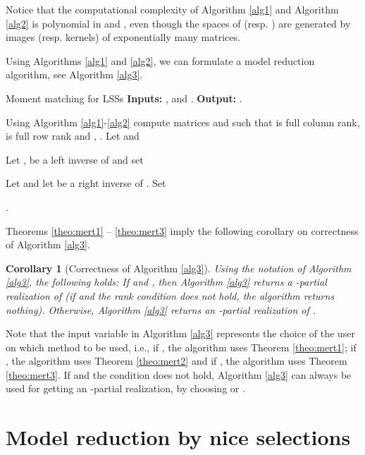 \documentclass[journal]{IEEEtran}
\newtheorem{Corollary}{Corollary}
\begin{document}
Notice that the computational complexity of Algorithm \ref{alg1} and Algorithm \ref{alg2} is polynomial in  and , even though the spaces of  (resp. ) are generated by images (resp. kernels) of exponentially many matrices.

Using Algorithms \ref{alg1} and \ref{alg2}, we can formulate a model reduction algorithm, see Algorithm \ref{alg3}.
\begin{algorithm}
	\caption{Moment matching for LSSs
		\newpage 
		\textbf{Inputs:} ,  and .
		\newpage  
		\textbf{Output: } .
	}
	\label{alg3}
	\begin{algorithmic}
		\STATE Using Algorithm \ref{alg1}-\ref{alg2} compute matrices  and  such that
		 is full column rank,  is full row rank and ,
		.
		\STATE
		Let  and
		
		\ENDIF
		\IF{}
\STATE
		Let ,  be a left inverse of  and set
		
		\ENDIF
		\IF{}
		\STATE
		Let  and let  be a right inverse of . Set
		
		\ENDIF
		\RETURN .
	\end{algorithmic}
\end{algorithm}


Theorems \ref{theo:mert1} -- \ref{theo:mert3} imply the following corollary on correctness of Algorithm \ref{alg3}.

\begin{Corollary}[Correctness of Algorithm \ref{alg3}]
	Using the notation of Algorithm \ref{alg3}, the following holds: If  and , then Algorithm \ref{alg3} returns a -partial realization of  (if  and the rank condition does not hold, the algorithm returns nothing). Otherwise, Algorithm \ref{alg3} returns an -partial realization of .
\end{Corollary}

Note that the input variable  in Algorithm \ref{alg3} represents the choice of the user on which method to be used, i.e., if , the algorithm uses Theorem \ref{theo:mert1}; if , the algorithm uses Theorem \ref{theo:mert2} and if , the algorithm uses Theorem \ref{theo:mert3}. If  and the condition  does not hold, Algorithm \ref{alg3} can always be used for getting an -partial realization, by choosing  or  .

\section{Model reduction by nice selections}
\label{sect:nice}
\end{document}
